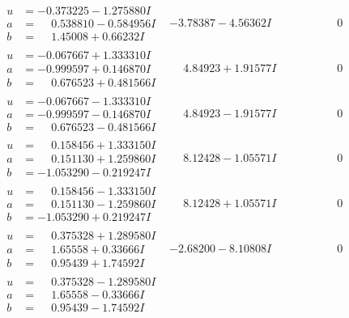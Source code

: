 \documentclass[1p]{elsarticle_modified}
\theoremstyle{definition}
\begin{document}
$$\begin{array}{c|c|c}
\begin{aligned}
u &= -0.373225 - 1.275880 I \\
a &= \phantom{-}0.538810 - 0.584956 I \\
b &= \phantom{-}1.45008 + 0.66232 I\end{aligned}
 & -3.78387 - 4.56362 I & \phantom{-0.000000 } 0 \\ \hline\begin{aligned}
u &= -0.067667 + 1.333310 I \\
a &= -0.999597 + 0.146870 I \\
b &= \phantom{-}0.676523 + 0.481566 I\end{aligned}
 & \phantom{-}4.84923 + 1.91577 I & \phantom{-0.000000 } 0 \\ \hline\begin{aligned}
u &= -0.067667 - 1.333310 I \\
a &= -0.999597 - 0.146870 I \\
b &= \phantom{-}0.676523 - 0.481566 I\end{aligned}
 & \phantom{-}4.84923 - 1.91577 I & \phantom{-0.000000 } 0 \\ \hline\begin{aligned}
u &= \phantom{-}0.158456 + 1.333150 I \\
a &= \phantom{-}0.151130 + 1.259860 I \\
b &= -1.053290 - 0.219247 I\end{aligned}
 & \phantom{-}8.12428 - 1.05571 I & \phantom{-0.000000 } 0 \\ \hline\begin{aligned}
u &= \phantom{-}0.158456 - 1.333150 I \\
a &= \phantom{-}0.151130 - 1.259860 I \\
b &= -1.053290 + 0.219247 I\end{aligned}
 & \phantom{-}8.12428 + 1.05571 I & \phantom{-0.000000 } 0 \\ \hline\begin{aligned}
u &= \phantom{-}0.375328 + 1.289580 I \\
a &= \phantom{-}1.65558 + 0.33666 I \\
b &= \phantom{-}0.95439 + 1.74592 I\end{aligned}
 & -2.68200 - 8.10808 I & \phantom{-0.000000 } 0 \\ \hline\begin{aligned}
u &= \phantom{-}0.375328 - 1.289580 I \\
a &= \phantom{-}1.65558 - 0.33666 I \\
b &= \phantom{-}0.95439 - 1.74592 I\end{aligned}

\end{array}$$
\end{document}
